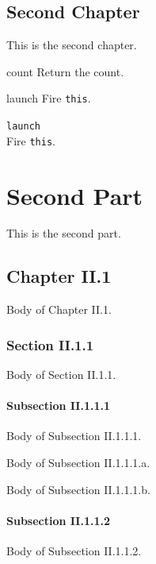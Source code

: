 \documentclass[openright,twoside,11pt]{book}
\begin{document}
\chapter{Second Chapter}

This is the second chapter.



\begin{urbiscriptapi}
\item[count]Return the count.
\item[launch]
  Fire \lstinline|this|.
\item \lstinline|launch|~\\
  Fire \lstinline|this|.

\end{urbiscriptapi}

\part{Second Part}

This is the second part.

\chapter{Chapter II.1}
Body of Chapter II.1.

\let\subsubsectionSave\subsubsection
\let\subsubsection\faqsection
\section{Section II.1.1}
Body of Section II.1.1.

\subsection{Subsection II.1.1.1}
Body of Subsection II.1.1.1.

Body of Subsection II.1.1.1.a.

Body of Subsection II.1.1.1.b.

\subsection{Subsection II.1.1.2}
Body of Subsection II.1.1.2.
\end{document}
